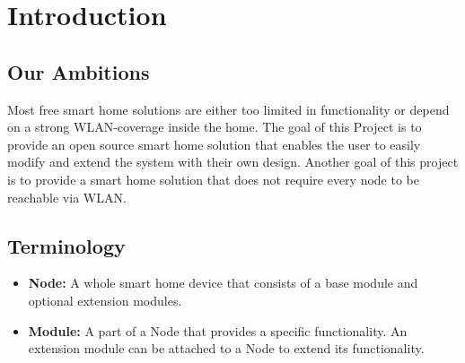 \chapter{Introduction}
    \section{Our Ambitions}
        Most free smart home solutions are either too limited in
        functionality or depend on a strong WLAN-coverage inside the
        home.
        The goal of this Project is to provide an open source
        smart home solution that enables the user to easily modify 
        and extend the system with their own design. Another goal of
        this project is to provide a smart home solution that does
        not require every node to be reachable via WLAN.

    \section{Terminology}
        \begin{itemize}
            \item \textbf{Node:} A whole smart home device that
            consists of a base module and optional extension modules.

            \item \textbf{Module:} A part of a Node that provides
            a specific functionality. An extension module can be
            attached to a Node to extend its functionality.

        \end{itemize}


    